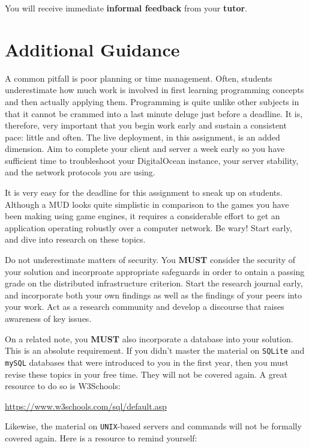 \documentclass{../../fal_assignment}
\begin{document}
You will receive immediate \textbf{informal feedback} from your \textbf{tutor}.

\section*{Additional Guidance}

A common pitfall is poor planning or time management. Often, students underestimate how much work is involved in first learning programming concepts and then actually applying them. Programming is quite unlike other subjects in that it cannot be crammed into a last minute deluge just before a deadline. It is, therefore, very important that you begin work early and sustain a consistent pace: little and often. The live deployment, in this assignment, is an added dimension. Aim to complete your client and server a week early so you have sufficient time to troubleshoot your DigitalOcean instance, your server stability, and the network protocols you are using.

It is very easy for the deadline for this assignment to sneak up on students. Although a MUD looks quite simplistic in comparison to the games you have been making using game engines, it requires a considerable effort to get an application operating robustly over a computer network. Be wary! Start early, and dive into research on these topics. 

Do not underestimate matters of security. You \textbf{MUST} consider the security of your solution and incorproate appropriate safeguards in order to ontain a passing grade on the distributed infrastructure criterion. Start the research journal early, and incorporate both your own findings as well as the findings of your peers into your work. Act as a research community and develop a discourse that raises awareness of key issues.

On a related note, you \textbf{MUST} also incorporate a database into your solution. This is an absolute requirement. If you didn't master the material on \texttt{SQLite} and \texttt{mySQL} databases that were introduced to you in the first year, then you must revise these topics in your free time. They will not be covered again. A great resource to do so is W3Schools:

\url{https://www.w3schools.com/sql/default.asp}

Likewise, the material on \texttt{UNIX}-based servers and commands will not be formally covered again. Here is a resource to remind yourself:
\end{document}
